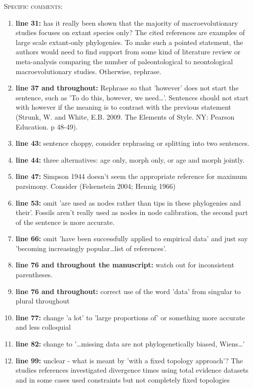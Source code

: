 \documentclass[12pt,letterpaper]{article}
\renewcommand{\section}[1]{%
\bigskip
\begin{center}
\begin{Large}
\normalfont\scshape #1
\medskip
\end{Large}
\end{center}}
\begin{document}
\section{Specific comments:}
\begin{enumerate}
\item{\textbf{line 31:}} has it really been shown that the majority of macroevolutionary studies focuses on extant species only? The cited references are examples of large scale extant-only phylogenies. To make such a pointed statement, the authors would need to find support from some kind of literature review or meta-analysis comparing the number of paleontological to neontological macroevolutionary studies. Otherwise, rephrase. 
\item{\textbf{line 37 and throughout:}} Rephrase so that 'however' does not start the sentence, such as 'To do this, however, we need…'. Sentences should not start with however if the meaning is to contrast with the previous statement (Strunk, W. and White, E.B. 2009. The Elements of Style. NY: Pearson Education. p 48-49).
\item{\textbf{line 43:}} sentence choppy, consider rephrasing or splitting into two sentences.
\item{\textbf{line 44:}} three alternatives: age only, morph only, or age and morph jointly. 
\item{\textbf{line 47:}} Simpson 1944 doesn't seem the appropriate reference for maximum parsimony. Consider (Felsenstein 2004; Hennig 1966) 
\item{\textbf{line 53:}} omit 'are used as nodes rather than tips in these phylogenies and their'. Fossils aren't really used as nodes in node calibration, the second part of the sentence is more accurate.
\item{\textbf{line 66:}} omit 'have been successfully applied to empirical data' and just say 'becoming increasingly popular…list of references'. 
\item{\textbf{line 76 and throughout the manuscript:}} watch out for inconsistent parentheses.
\item{\textbf{line 76 and throughout:}} correct use of the word 'data' from singular to plural throughout
\item{\textbf{line 77:}} change 'a lot' to 'large proportions of' or something more accurate and less colloquial
\item{\textbf{line 82:}} change to '…missing data are not phylogenetically biased, Wiens…'
\item{\textbf{line 99:}} unclear - what is meant by 'with a fixed topology approach'? The studies references investigated divergence times using total evidence datasets and in some cases used constraints but not completely fixed topologies

\end{enumerate}
\end{document}
